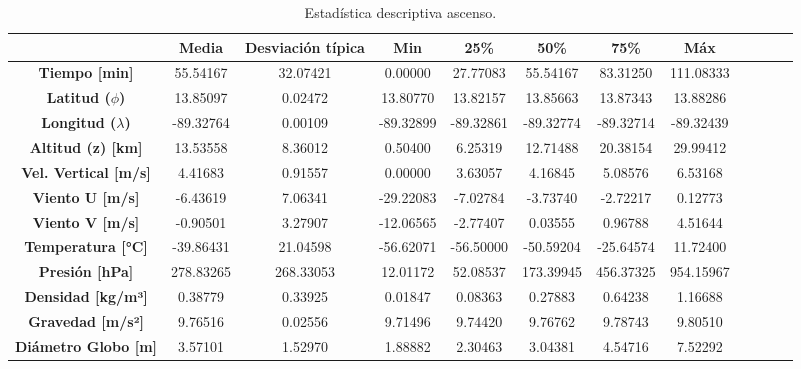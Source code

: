 \begin{table}
\small
\centering
\caption{Estadística descriptiva ascenso.}
\label{tab:desciptivo_ascenso}
\begin{tabular}{cccccccccccc}
\toprule
{} &  \textbf{Media} &  \textbf{Desviación típica} &  \textbf{Min} &  \textbf{25\%} &  \textbf{50\%} &  \textbf{75\%} &  \textbf{Máx} \\
\midrule
\textbf{\textbf{Tiempo [min]}        } &        55.54167 &                    32.07421 &       0.00000 &       27.77083 &       55.54167 &       83.31250 &     111.08333 \\
\textbf{\textbf{Latitud ($\phi$)}    } &        13.85097 &                     0.02472 &      13.80770 &       13.82157 &       13.85663 &       13.87343 &      13.88286 \\
\textbf{\textbf{Longitud ($\lambda$)}} &       -89.32764 &                     0.00109 &     -89.32899 &      -89.32861 &      -89.32774 &      -89.32714 &     -89.32439 \\
\textbf{\textbf{Altitud (z) [km]}    } &        13.53558 &                     8.36012 &       0.50400 &        6.25319 &       12.71488 &       20.38154 &      29.99412 \\
\textbf{\textbf{Vel. Vertical [m/s]} } &         4.41683 &                     0.91557 &       0.00000 &        3.63057 &        4.16845 &        5.08576 &       6.53168 \\
\textbf{\textbf{Viento U [m/s]}      } &        -6.43619 &                     7.06341 &     -29.22083 &       -7.02784 &       -3.73740 &       -2.72217 &       0.12773 \\
\textbf{\textbf{Viento V [m/s]}      } &        -0.90501 &                     3.27907 &     -12.06565 &       -2.77407 &        0.03555 &        0.96788 &       4.51644 \\
\textbf{\textbf{Temperatura [°C]}    } &       -39.86431 &                    21.04598 &     -56.62071 &      -56.50000 &      -50.59204 &      -25.64574 &      11.72400 \\
\textbf{\textbf{Presión [hPa]}       } &       278.83265 &                   268.33053 &      12.01172 &       52.08537 &      173.39945 &      456.37325 &     954.15967 \\
\textbf{\textbf{Densidad [kg/m³]}    } &         0.38779 &                     0.33925 &       0.01847 &        0.08363 &        0.27883 &        0.64238 &       1.16688 \\
\textbf{\textbf{Gravedad [m/s²]}     } &         9.76516 &                     0.02556 &       9.71496 &        9.74420 &        9.76762 &        9.78743 &       9.80510 \\
\textbf{\textbf{Diámetro Globo [m]}  } &         3.57101 &                     1.52970 &       1.88882 &        2.30463 &        3.04381 &        4.54716 &       7.52292 \\
\bottomrule
\end{tabular}
\end{table}
